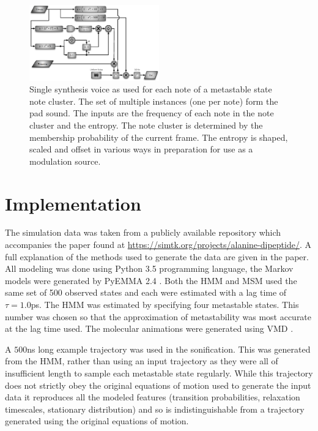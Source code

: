 \documentclass[a4paper,10pt,oneside]{article}
\begin{document}
\begin{sloppy}
\begin{table}
\begin{center}
    \label{tab:table1}
  \end{center}
\end{table}
\begin{figure}
\includegraphics[width=0.5\textwidth]{./synthesis_process_2.eps}
\caption{Single synthesis voice as used for each note of a metastable state note cluster. The set of multiple instances (one per note) form the pad sound. The inputs are the frequency of each note in the note cluster and the entropy. The note cluster is determined by the membership probability of the current frame. The entropy is shaped, scaled and offset in various ways in preparation for use as a modulation source.}\label{fig:synthProcess}
\label{fig:entropymap}
\end{figure}

\section{Implementation} \label{sec:impl}
The simulation data was taken from a publicly available repository which accompanies the paper \cite{Chodera2007} found at \url{https://simtk.org/projects/alanine-dipeptide/}.  A full explanation of the methods used to generate the data are given in the paper.  All modeling was done using Python 3.5 programming language, the Markov models were generated by PyEMMA 2.4 \cite{scherer_pyemma_2015}. Both the HMM and MSM used the same set of 500 observed states and each were estimated with a lag time of $\tau=1.0$ps. The HMM was estimated by specifying four metastable states. This number was chosen so that the approximation of metastability was most accurate at the lag time used. The molecular animations were generated using VMD \cite{HUMP96}.  

A $500$ns long example trajectory was used in the sonification.  This was generated from the HMM, rather than using an input trajectory as they were all of insufficient length to sample each metastable state regularly.  While this trajectory does not strictly obey the original equations of motion used to generate the input data it reproduces all the modeled features (transition probabilities, relaxation timescales, stationary distribution) and so is indistinguishable from a trajectory generated using the original equations of motion. 


\end{sloppy}
\end{document}
